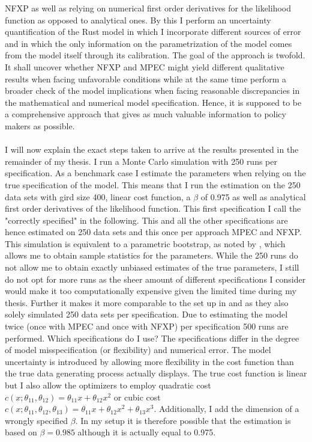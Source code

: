 NFXP as well as relying on numerical first order derivatives for the likelihood function as opposed to analytical ones. By this I perform an uncertainty quantification of the Rust model in which I incorporate different sources of error and in which the only information on the parametrization of the model comes from the model itself through its calibration. The goal of the approach is twofold. It shall uncover whether NFXP and MPEC might yield different qualitative results when facing unfavorable conditions while at the same time perform a broader check of the model implications when facing reasonable discrepancies in the mathematical and numerical model specification. Hence, it is supposed to be a comprehensive approach that gives as much valuable information to policy makers as possible. \paragraph{}

I will now explain the exact steps taken to arrive at the results presented in the remainder of my thesis. I run a Monte Carlo simulation with 250 runs per specification. As a benchmark case I estimate the parameters when relying on the true specification of the model. This means that I run the estimation on the 250 data sets with gird size 400, linear cost function, a $\beta$ of 0.975 as well as analytical first order derivatives of the likelihood function. This first specification I call the "correctly specified" in the following. This and all the other specifications are hence estimated on 250 data sets and this once per approach MPEC and NFXP. This simulation is equivalent to a parametric bootstrap, as noted by \cite{Su.Judd.2012}, which allows me to obtain sample statistics for the parameters. While the 250 runs do not allow me to obtain exactly unbiased estimates of the true parameters, I still do not opt for more runs as the sheer amount of different specifications I consider would make it too computationally expensive given the limited time during my thesis. Further it makes it more comparable to the set up in \cite{Iskhakov.2016} and \cite{Su.Judd.2012} as they also solely simulated 250 data sets per specification. Due to estimating the model twice (once with MPEC and once with NFXP) per specification 500 runs are performed. Which specifications do I use? The specifications differ in the degree of model misspecification (or flexibility) and numerical error. The model uncertainty is introduced by allowing more flexibility in the cost function than the true data generating process actually displays. The true cost function is linear but I also allow the optimizers to employ quadratic cost $c(x; \theta_{11}, \theta_{12}) = \theta_{11}x + \theta_{12}x^2$ or cubic cost $c(x; \theta_{11}, \theta_{12}, \theta_{13}) = \theta_{11}x + \theta_{12}x^2 + \theta_{13}x^3$. Additionally, I add the dimension of a wrongly specified $\beta$. In my setup it is therefore possible that the estimation is based on $\beta = 0.985$ although it is actually equal to 0.975.

